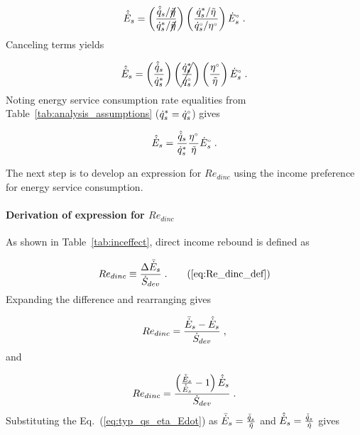 \begin{equation}
  \hat{\dot{E}}_s = \left( \frac{\hat{\dot{q}}_s / \cancel{\tilde{\eta}}}{{\dot{q}}^*_s / \cancel{\tilde{\eta}}} \right)
                \left( \frac{{\dot{q}}^*_s / \tilde{\eta}}{{}{\dot{q}}^{\scriptscriptstyle \circ}_s / {}{\eta}^{\scriptscriptstyle \circ}} \right)
                {}{\dot{E}}^{\scriptscriptstyle \circ}_s \; .
\end{equation}
%
Canceling terms yields

\begin{equation}
  \hat{\dot{E}}_s = \left( \frac{\hat{\dot{q}}_s}{{\dot{q}}^*_s} \right)
                \left( \cancel{\frac{{\dot{q}}^*_s}{{}{\dot{q}}^{\scriptscriptstyle \circ}_s}} \right)
                \left( \frac{{}{\eta}^{\scriptscriptstyle \circ}}{\tilde{\eta}}  \right)
                {}{\dot{E}}^{\scriptscriptstyle \circ}_s \; .
\end{equation}
%
Noting energy service consumption rate equalities from Table~\ref{tab:analysis_assumptions}
(${\dot{q}}^*_s = {}{\dot{q}}^{\scriptscriptstyle \circ}_s$) gives

\begin{equation} \label{eq:E_dot_s_hat}
  \hat{\dot{E}}_s = \frac{\hat{\dot{q}}_s}{{\dot{q}}^*_s}
                \frac{{}{\eta}^{\scriptscriptstyle \circ}}{\tilde{\eta}}
                {}{\dot{E}}^{\scriptscriptstyle \circ}_s \; .
\end{equation}

The next step is to develop an expression for $Re_{dinc}$
using the income preference for energy service consumption.


\paragraph{Derivation of expression for $Re_{dinc}$}
\label{sec:Re_dinc}

As shown in Table~\ref{tab:inceffect}, direct income rebound is defined as

\begin{equation}
  Re_{dinc} \equiv \frac{\Delta \rainc{E}_s}{\Sdot} \; . \tag{\ref{eq:Re_dinc_def}}
\end{equation}
%
Expanding the difference and rearranging gives

\begin{equation}
  Re_{dinc} = \frac{\bar{\dot{E}}_s - \hat{\dot{E}}_s}{\dot{S}_{dev}} \; , 
\end{equation}
%
and

\begin{equation}
  Re_{dinc} = \frac{\left( \frac{\bar{\dot{E}}_s}{\hat{\dot{E}}_s} - 1  \right) \hat{\dot{E}}_s}{\dot{S}_{dev}} \; .
\end{equation}
%
Substituting the Eq.~(\ref{eq:typ_qs_eta_Edot}) as
$\bar{\dot{E}}_s = \frac{\bar{\dot{q}}_s}{\tilde{\eta}}$ and  
$\hat{\dot{E}}_s = \frac{\hat{\dot{q}}_s}{\tilde{\eta}}$ gives

